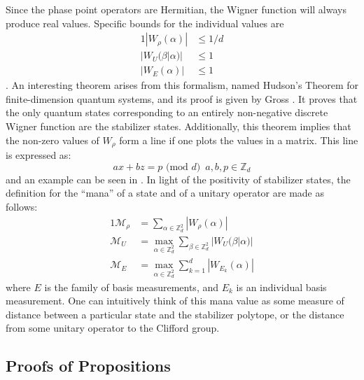 \documentclass[../3Wworkreport.tex]{subfiles}
\begin{document}
Since the phase point operators are Hermitian, the Wigner function will always produce real values. Specific bounds for the individual values are
\begin{alignat}{1}
	|W_\rho(\alpha)| &\le 1/d\\
	|W_U(\beta | \alpha)| &\le 1\\
	|W_E(\alpha)| &\le 1
\end{alignat}
\parencite{Pashayan2014}. An interesting theorem arises from this formalism, named Hudson's Theorem for finite-dimension quantum systems, and its proof is given by Gross \parencite*{Gross2006}. It proves that the only quantum states corresponding to an entirely non-negative discrete Wigner function are the stabilizer states. Additionally, this theorem implies that the non-zero values of $W_\rho$ form a line if one plots the values in a matrix. This line is expressed as:
\begin{equation}
	ax + bz = p \text{ (mod }d) \,\,\, a,b,p \in \mathbb{Z}_d
\end{equation}
and an example can be seen in . In light of the positivity of stabilizer states, the definition for the ``mana'' of a state and of a unitary operator are made as follows:
\begin{alignat}{1}
	\mathcal{M}_\rho &= \sum\limits_{\alpha \in \mathbb{Z}_d^2} |W_\rho(\alpha)|\\
	\mathcal{M}_U &= \max\limits_{\alpha \in \mathbb{Z}_d^2} \sum\limits_{\beta \in \mathbb{Z}_d^2} |W_U(\beta | \alpha)|\\
	\mathcal{M}_E &= \max\limits_{\alpha \in \mathbb{Z}_d^2} \sum\limits_{k=1}^{d} |W_{E_k} (\alpha)|
\end{alignat}
where $E$ is the family of basis measurements, and $E_k$ is an individual basis measurement. One can intuitively think of this mana value as some measure of distance between a particular state and the stabilizer polytope, or the distance from some unitary operator to the Clifford group.

\newpage
\subsection{Proofs of Propositions}
\label{app:proofs}
\setcounter{prop}{0}
\end{document}
